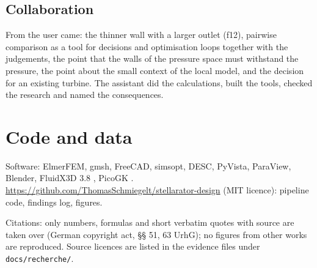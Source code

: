 \documentclass[10pt,a4paper]{article}
\begin{document}



\subsection{Collaboration}
From the user came: the thinner wall with a larger outlet (f12), pairwise comparison as a tool for decisions and
optimisation loops together with the judgements, the point that the walls of the pressure space must withstand
the pressure, the point about the small context of the local model, and the decision for an existing turbine. The
assistant did the calculations, built the tools, checked the research and named the consequences.










\section*{Code and data}
Software: ElmerFEM, gmsh, FreeCAD, simsopt, DESC, PyVista, ParaView, Blender, FluidX3D 3.8 \cite{fluidx3d}, PicoGK \cite{picogk}.
\url{https://github.com/ThomasSchmiegelt/stellarator-design} (MIT licence): pipeline code, findings log, figures.

Citations: only numbers, formulas and short verbatim quotes with source are taken over (German copyright act, §§ 51, 63
UrhG); no figures from other works are reproduced. Source licences are listed in the evidence files under
\texttt{docs/recherche/}.
\end{document}
